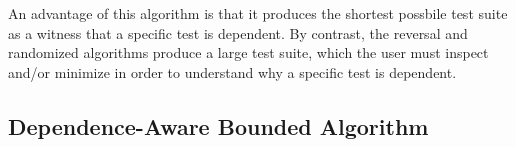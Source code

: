An advantage of this algorithm is that it produces the shortest possbile
test suite as a witness that a specific test is dependent.  By contrast,
the reversal and randomized algorithms produce a large test suite, which
the user must inspect and/or minimize in order to understand why a specific
test is dependent.


\subsection{Dependence-Aware Bounded Algorithm}
\label{sec:advalgorithm}

%
%
%
%
%
%
